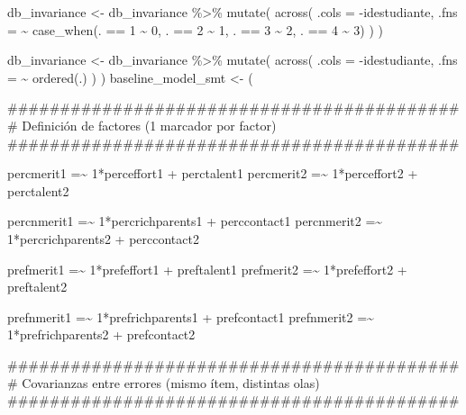 \documentclass[
  12pt,
]{article}
\newenvironment{Shaded}{\begin{snugshade}}{\end{snugshade}}
\newcommand{\AttributeTok}[1]{\textcolor[rgb]{0.40,0.45,0.13}{#1}}
\newcommand{\DecValTok}[1]{\textcolor[rgb]{0.68,0.00,0.00}{#1}}
\newcommand{\FunctionTok}[1]{\textcolor[rgb]{0.28,0.35,0.67}{#1}}
\newcommand{\NormalTok}[1]{\textcolor[rgb]{0.00,0.23,0.31}{#1}}
\newcommand{\OtherTok}[1]{\textcolor[rgb]{0.00,0.23,0.31}{#1}}
\newcommand{\SpecialCharTok}[1]{\textcolor[rgb]{0.37,0.37,0.37}{#1}}
\newcommand{\StringTok}[1]{\textcolor[rgb]{0.13,0.47,0.30}{#1}}
\begin{document}
\begin{Shaded}
\begin{Highlighting}[]
\NormalTok{db\_invariance }\OtherTok{\textless{}{-}}\NormalTok{ db\_invariance }\SpecialCharTok{\%\textgreater{}\%} 
  \FunctionTok{mutate}\NormalTok{(}
    \FunctionTok{across}\NormalTok{(}
      \AttributeTok{.cols =} \SpecialCharTok{{-}}\NormalTok{idestudiante,}
      \AttributeTok{.fns =} \SpecialCharTok{\textasciitilde{}} \FunctionTok{case\_when}\NormalTok{(. }\SpecialCharTok{==} \DecValTok{1} \SpecialCharTok{\textasciitilde{}} \DecValTok{0}\NormalTok{,}
\NormalTok{                         . }\SpecialCharTok{==} \DecValTok{2} \SpecialCharTok{\textasciitilde{}} \DecValTok{1}\NormalTok{,}
\NormalTok{                         . }\SpecialCharTok{==} \DecValTok{3} \SpecialCharTok{\textasciitilde{}} \DecValTok{2}\NormalTok{,}
\NormalTok{                         . }\SpecialCharTok{==} \DecValTok{4} \SpecialCharTok{\textasciitilde{}} \DecValTok{3}\NormalTok{)}
\NormalTok{    )}
\NormalTok{  )}

\NormalTok{db\_invariance }\OtherTok{\textless{}{-}}\NormalTok{ db\_invariance }\SpecialCharTok{\%\textgreater{}\%} 
  \FunctionTok{mutate}\NormalTok{(}
    \FunctionTok{across}\NormalTok{(}
      \AttributeTok{.cols =} \SpecialCharTok{{-}}\NormalTok{idestudiante,}
      \AttributeTok{.fns =} \SpecialCharTok{\textasciitilde{}} \FunctionTok{ordered}\NormalTok{(.)}
\NormalTok{    )}
\NormalTok{  )}
\NormalTok{baseline\_model\_smt }\OtherTok{\textless{}{-}}\NormalTok{ (}\StringTok{\textquotesingle{}}

\StringTok{\#\#\#\#\#\#\#\#\#\#\#\#\#\#\#\#\#\#\#\#\#\#\#\#\#\#\#\#\#\#\#\#\#\#\#\#\#\#\#\#\#\#\#}
\StringTok{\# Definición de factores (1 marcador por factor)}
\StringTok{\#\#\#\#\#\#\#\#\#\#\#\#\#\#\#\#\#\#\#\#\#\#\#\#\#\#\#\#\#\#\#\#\#\#\#\#\#\#\#\#\#\#\#}

\StringTok{percmerit1  =\textasciitilde{} 1*perceffort1     + perctalent1}
\StringTok{percmerit2  =\textasciitilde{} 1*perceffort2     + perctalent2}

\StringTok{percnmerit1 =\textasciitilde{} 1*percrichparents1 + perccontact1}
\StringTok{percnmerit2 =\textasciitilde{} 1*percrichparents2 + perccontact2}

\StringTok{prefmerit1  =\textasciitilde{} 1*prefeffort1     + preftalent1}
\StringTok{prefmerit2  =\textasciitilde{} 1*prefeffort2     + preftalent2}

\StringTok{prefnmerit1 =\textasciitilde{} 1*prefrichparents1 + prefcontact1}
\StringTok{prefnmerit2 =\textasciitilde{} 1*prefrichparents2 + prefcontact2}


\StringTok{\#\#\#\#\#\#\#\#\#\#\#\#\#\#\#\#\#\#\#\#\#\#\#\#\#\#\#\#\#\#\#\#\#\#\#\#\#\#\#\#\#\#\#}
\StringTok{\# Covarianzas entre errores (mismo ítem, distintas olas)}
\StringTok{\#\#\#\#\#\#\#\#\#\#\#\#\#\#\#\#\#\#\#\#\#\#\#\#\#\#\#\#\#\#\#\#\#\#\#\#\#\#\#\#\#\#\#}


\end{Highlighting}
\end{Shaded}
\end{document}

